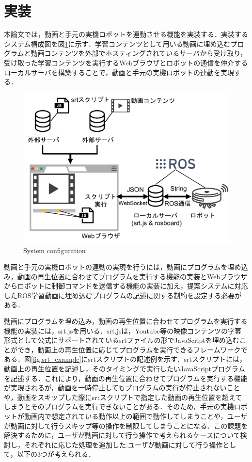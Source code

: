 \documentclass{ujarticle}
\begin{document}
\section{実装}
本論文では，動画と手元の実機ロボットを連動させる機能を実装する．実装するシステム構成図を図\ref{fig:Implemented_system}に示す．学習コンテンツとして用いる動画に埋め込むプログラムと動画コンテンツを外部でホスティングされているサーバから受け取り，受け取った学習コンテンツを実行するWebブラウザとロボットの通信を仲介するローカルサーバを構築することで，動画と手元の実機ロボットの連動を実現する．

\begin{figure}[t]
  \centering
  \includegraphics[keepaspectratio, scale=0.4]{./src/Implemented_system.pdf}
  \caption{System configuration}
  \label{fig:Implemented_system}
\end{figure}

\par 動画と手元の実機ロボットの連動の実現を行うには，動画にプログラムを埋め込み，動画の再生位置に合わせてプログラムを実行する機能の実装とWebブラウザからロボットに制御コマンドを送信する機能の実装に加え，提案システムに対応したROS学習動画に埋め込むプログラムの記述に関する制約を設定する必要がある．
\par 動画にプログラムを埋め込み，動画の再生位置に合わせてプログラムを実行する機能の実装には，srt.js\cite{srt.js}を用いる．srt.jsは，Youtube等の映像コンテンツの字幕形式として公式にサポートされているsrtファイルの形でJavaScriptを埋め込むことができ，動画上の再生位置に応じてプログラムを実行できるフレームワークである．図\ref{fig:srt_example}にsrtスクリプトの記述例を示す．srtスクリプトには，動画上の再生位置を記述し，そのタイミングで実行したいJavaScriptプログラムを記述する．これにより，動画の再生位置に合わせてプログラムを実行する機能が実現されるが，動画を一時停止してもプログラムの実行が停止されないことや，動画をスキップした際にsrtスクリプトで指定した動画の再生位置を超えてしまうとそのプログラムを実行できないことがある．そのため，手元の実機ロボットが動画内で想定されている動作以上の範囲で動作してしまうことや，ユーザが動画に対して行うスキップ等の操作を制限してしまうことになる．この課題を解決するために，ユーザが動画に対して行う操作で考えられるケースについて検討し，それぞれに応じた処理を追加した.ユーザが動画に対して行う操作として，以下の3つが考えられる．
\end{document}
